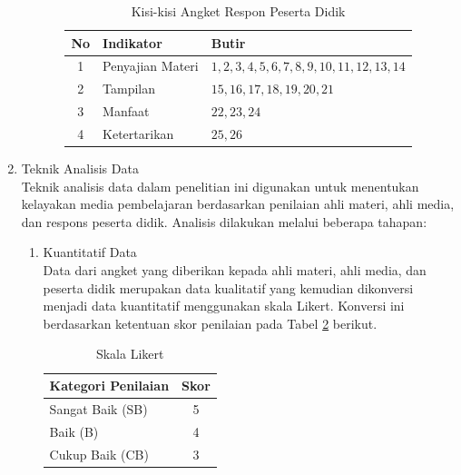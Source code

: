 \begin{enumerate}
\begin{enumerate}
\begin{enumerate}
            \begin{table}[H]
                \centering
                \caption{Kisi-kisi Angket Respon Peserta Didik}
                \label{kisiresponsiswa}
                \begin{tabular}{|c|p{3cm}|p{6.5cm}|}
                    \hline
                    \textbf{No} & \textbf{Indikator} & \textbf{Butir}\\
                    \hline
                    1 & Penyajian Materi & \(1,2,3,4,5,6,7,8,9,10,11, 12,13,14\)\\
                    2& Tampilan & \(15,16,17,18,19,20,21\)\\
                    3& Manfaat & \(22,23,24\)\\
                    4& Ketertarikan & \(25,26\)\\
                    \hline
                \end{tabular}
            \end{table}
        \end{enumerate}
    \end{enumerate}
    \item Teknik Analisis Data\\
    \hspace*{1cm}Teknik analisis data dalam penelitian ini digunakan untuk menentukan kelayakan media pembelajaran berdasarkan penilaian ahli materi, ahli media, dan respons peserta didik. Analisis dilakukan melalui beberapa tahapan:
    \begin{enumerate}
        \item Kuantitatif Data\\
        \hspace*{1cm}Data dari angket yang diberikan kepada ahli materi, ahli media, dan peserta didik merupakan data kualitatif yang kemudian dikonversi menjadi data kuantitatif menggunakan skala Likert. Konversi ini berdasarkan ketentuan skor penilaian pada Tabel \ref{likert} berikut.
        \begin{table}[H]
            \centering
            \caption{Skala Likert}
            \label{likert}
            \begin{tabular}{|p{5cm}|c|}
                \hline
                \textbf{Kategori Penilaian} & \textbf{Skor}\\
                \hline
                Sangat Baik (SB) & 5\\
                Baik (B) & 4\\
                Cukup Baik (CB) & 3\\

\end{tabular}
\end{table}
\end{enumerate}
\end{enumerate}
